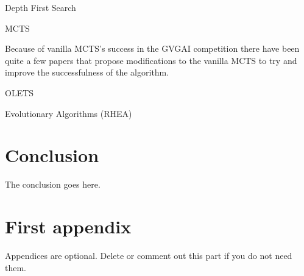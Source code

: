 \documentclass[journal]{IEEEtran}
\begin{document}
		Depth First Search
		
		MCTS
		
		Because of vanilla MCTS's success in the GVGAI competition there have been quite a few papers that propose modifications to the vanilla MCTS to try and improve the successfulness of the algorithm.
		
		OLETS
		
		
		Evolutionary Algorithms
		(RHEA)
		
		
	
		
		
		


\section{Conclusion}
The conclusion goes here.






\appendices
\section{First appendix}
Appendices are optional. Delete or comment out this part if you do not need them.

\end{document}
